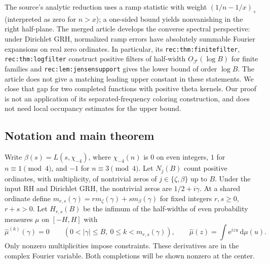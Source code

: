 \documentclass[11pt]{article}
\theoremstyle{remark}\newtheorem{remark}[theorem]{Remark}
\newcommand{\e}{\mathrm e}
\newcommand{\dd}{\,\mathrm d}
\newcommand{\abs}[1]{\lvert#1\rvert}
\begin{document}
The source's analytic reduction \cite{onesided} uses a ramp statistic with weight $(1/n-1/x)_+$ (interpreted as zero for $n>x$); a one-sided bound yields nonvanishing in the right half-plane. The merged article \cite{article,rec,zer} develops the converse spectral perspective: under Dirichlet GRH, normalized ramp errors have absolutely summable Fourier expansions on real zero ordinates. In particular, its \texttt{rec:thm:finitefilter}, \texttt{rec:thm:logfilter} construct positive filters of half-width $O_{\mathcal F}(\log B)$ for finite families and \texttt{rec:lem:jensensupport} gives the lower bound of order $\log B$. The article does not give a matching leading upper constant in these statements. We close that gap for two completed functions with positive theta kernels. Our proof is not an application of its separated-frequency coloring construction, and does not need local occupancy estimates for the upper bound.

\subsection*{Notation and main theorem}
Write $\beta(s)=L(s,\chi_{-4})$, where $\chi_{-4}(n)$ is $0$ on even integers, $1$ for $n\equiv1\pmod4$, and $-1$ for $n\equiv3\pmod4$. Let $N_j(B)$ count positive ordinates, with multiplicity, of nontrivial zeros of $j\in\{\zeta,\beta\}$ up to $B$. Under the input RH and Dirichlet GRH, the nontrivial zeros are $1/2+i\gamma$. At a shared ordinate define $m_{r,s}(\gamma)=r m_\zeta(\gamma)+s m_\beta(\gamma)$ for fixed integers $r,s\ge0$, $r+s>0$. Let $H_{r,s}(B)$ be the infimum of the half-widths of even probability measures $\mu$ on $[-H,H]$ with
\[
 \widehat\mu^{(k)}(\gamma)=0\qquad(0<\abs\gamma\le B,\ 0\le k<m_{r,s}(\gamma)),
 \qquad \widehat\mu(z)=\int \e^{izu}\dd\mu(u).
\]
Only nonzero multiplicities impose constraints. These derivatives are in the complex Fourier variable. Both completions will be shown nonzero at the center.
\end{document}
